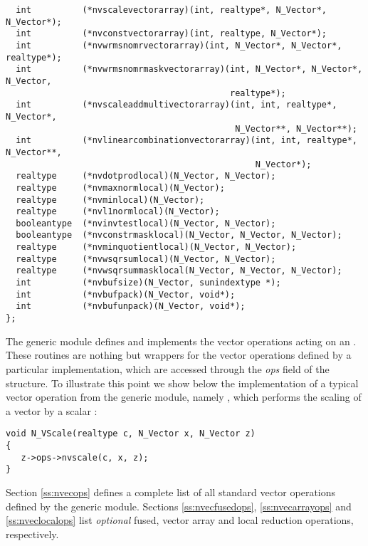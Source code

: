 \begin{verbatim}
  int          (*nvscalevectorarray)(int, realtype*, N_Vector*, N_Vector*);
  int          (*nvconstvectorarray)(int, realtype, N_Vector*);
  int          (*nvwrmsnomrvectorarray)(int, N_Vector*, N_Vector*, realtype*);
  int          (*nvwrmsnomrmaskvectorarray)(int, N_Vector*, N_Vector*, N_Vector,
                                            realtype*);
  int          (*nvscaleaddmultivectorarray)(int, int, realtype*, N_Vector*,
                                             N_Vector**, N_Vector**);
  int          (*nvlinearcombinationvectorarray)(int, int, realtype*, N_Vector**,
                                                 N_Vector*);
  realtype     (*nvdotprodlocal)(N_Vector, N_Vector);
  realtype     (*nvmaxnormlocal)(N_Vector);
  realtype     (*nvminlocal)(N_Vector);
  realtype     (*nvl1normlocal)(N_Vector);
  booleantype  (*nvinvtestlocal)(N_Vector, N_Vector);
  booleantype  (*nvconstrmasklocal)(N_Vector, N_Vector, N_Vector);
  realtype     (*nvminquotientlocal)(N_Vector, N_Vector);
  realtype     (*nvwsqrsumlocal)(N_Vector, N_Vector);
  realtype     (*nvwsqrsummasklocal(N_Vector, N_Vector, N_Vector);
  int          (*nvbufsize)(N_Vector, sunindextype *);
  int          (*nvbufpack)(N_Vector, void*);
  int          (*nvbufunpack)(N_Vector, void*);
};
\end{verbatim}

The generic {\nvector} module defines and implements the vector operations
acting on an . These routines are nothing but wrappers for
the vector operations defined by a particular {\nvector} implementation,
which are accessed through the {\em ops} field of the 
structure. To illustrate this point we show below the implementation of a
typical vector operation from the generic {\nvector} module, namely ,
which performs the scaling of a vector  by a scalar :
\begin{verbatim}
void N_VScale(realtype c, N_Vector x, N_Vector z)
{
   z->ops->nvscale(c, x, z);
}
\end{verbatim}
Section \ref{ss:nvecops} defines a complete list of all standard vector operations
defined by the generic {\nvector} module. Sections \ref{ss:nvecfusedops},
\ref{ss:nvecarrayops} and \ref{ss:nveclocalops} list \textit{optional} fused,
vector array and local reduction operations, respectively.


